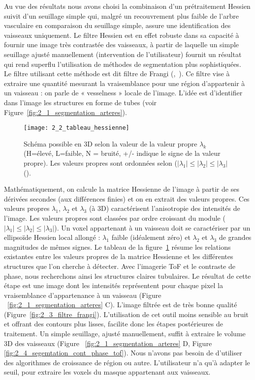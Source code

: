Au vue des résultats nous avons choisi la combinaison d’un prétraitement Hessien suivit d’un seuillage simple qui, malgré un recouvrement plus faible de l'arbre vasculaire en comparaison du seuillage simple, assure une identification des vaisseaux uniquement. Le filtre Hessien est en effet robuste dans sa capacité à fournir une image très contrastée des vaisseaux, à partir de laquelle un simple seuillage ajusté manuellement (intervention de l’utilisateur) fournit un résultat qui rend superflu l’utilisation de méthodes de segmentation plus sophistiquées. \\
Le filtre utilisant cette méthode est dit filtre de Frangi  (\cite{Frangi1998},~\cite{Manniesing2006}). Ce filtre vise à extraire une quantité mesurant la vraisemblance pour une région d’appartenir à un vaisseau : on parle de  « vesselness » locale de l’image. L’idée est d’identifier dans l’image les structures en forme de tubes (voir Figure~\ref{fig:2_1_segmentation_arteres}).\\
\begin{figure}[!t]
\centering
\texttt{[image: 2\_2\_tableau\_hessienne]}
\caption{Schéma possible en 3D selon la valeur de la valeur propre $\lambda_k$ (H=élevé, L=faible, N = bruité, +/- indique le signe de la valeur propre). Les valeurs propres sont ordonnées selon ($|\lambda_1|\leqslant |\lambda_2|\leqslant |\lambda_3|$ (\cite{Frangi1998}).}
\label{fig:2_2_tableau_hessienne}	
\end{figure}
Mathématiquement, on calcule la matrice Hessienne de l’image à partir de ses dérivées secondes (aux différences finies) et on en extrait des valeurs propres. Ces valeurs propres $\lambda_1$, $\lambda_2$ et $\lambda_3$ (à 3D) caractérisent l’anisotropie des intensités de l’image. Les valeurs propres sont classées par ordre croissant du module ($|\lambda_1|\leqslant|\lambda_2|\leqslant|\lambda_3|$). Un voxel appartenant à un vaisseau doit se caractériser par un ellipsoïde Hessien local allongé : $\lambda_1$ faible (idéalement zéro) et $\lambda_2$ et $\lambda_3$ de grandes magnitudes de mêmes signes. Le tableau de la figure~\ref{fig:2_2_tableau_hessienne} résume les relations existantes entre les valeurs propres de la matrice Hessienne et les différentes structures que l’on cherche à détecter. Avec l’imagerie ToF et le contraste de phase, nous recherchons ainsi les structures claires tubulaires. Le résultat de cette étape est une image dont les intensités représentent pour chaque pixel la vraisemblance d’appartenance à un vaisseau (Figure ~\ref{fig:2_1_segmentation_arteres} C). L’image filtrée est de très bonne qualité (Figure~\ref{fig:2_3_filtre_frangi}). L’utilisation de cet outil moins sensible au bruit et offrant des contours plus lisses, facilite donc les étapes postérieures de traitement. Un simple seuillage, ajusté manuellement, suffit à extraire le volume 3D des vaisseaux (Figure ~\ref{fig:2_1_segmentation_arteres} D, Figure \ref{fig:2_4_segemtation_cont_phase_tof}). Nous n’avons pas besoin de d’utiliser des algorithmes de croissance de région ou autre. L’utilisateur n’a qu’à adapter le seuil, pour extraire les voxels du masque appartenant aux vaisseaux. 
